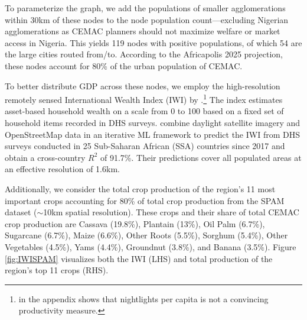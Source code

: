 \documentclass[a4paper]{article}
\begin{document}
To parameterize the graph, we add the populations of smaller agglomerations within 30km of these nodes to the node population count---excluding Nigerian agglomerations as CEMAC planners should not maximize welfare or market access in Nigeria. This yields 119 nodes with positive populations, of which 54 are the large cities routed from/to. According to the Africapolis 2025 projection, these nodes account for 80\% of the urban population of CEMAC.  \newline %

  To better distribute GDP across these nodes, we employ the high-resolution remotely sensed International Wealth Index (IWI) by \citet{lee2022high}.\footnote{\citet{krantz2024optimal} in the appendix shows that nightlights per capita is not a convincing productivity measure.} The index estimates asset-based household wealth on a scale from 0 to 100 based on a fixed set of household items recorded in DHS surveys. \citet{lee2022high} combine daylight satellite imagery and OpenStreetMap data in an iterative ML framework to predict the IWI from DHS surveys conducted in 25 Sub-Saharan African (SSA) countries since 2017 and obtain a cross-country $R^2$ of 91.7\%. Their predictions cover all populated areas at an effective resolution of 1.6km. \newline 
  
Additionally, we consider the total crop production of the region's 11 most important crops accounting for 80\% of total crop production from the SPAM dataset \citep{SPAM} ($\sim$10km spatial resolution). These crops and their share of total CEMAC crop production are Cassava (19.8\%), Plantain (13\%), Oil Palm (6.7\%), Sugarcane (6.7\%), Maize (6.6\%), Other Roots (5.5\%), Sorghum (5.4\%), Other Vegetables (4.5\%), Yams (4.4\%), Groundnut (3.8\%), and Banana (3.5\%). Figure \ref{fig:IWISPAM} visualizes both the IWI (LHS) and total production of the region's top 11 crops (RHS). 
\end{document}
